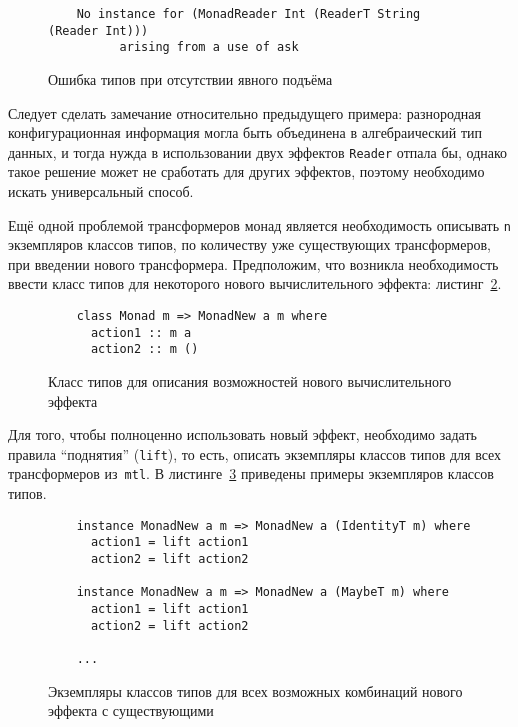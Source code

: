     \begin{figure}[t]
    \begin{lstlisting}
    No instance for (MonadReader Int (ReaderT String (Reader Int)))
          arising from a use of ask
    \end{lstlisting}
    \caption{Ошибка типов при отсутствии явного подъёма}
    \label{listing:mtlCompileError}
    \end{figure}

    Следует сделать замечание относительно предыдущего примера: разнородная
    конфигурационная информация могла быть объединена в алгебраический тип данных,
    и тогда нужда в использовании двух эффектов \lstinline{Reader} отпала бы,
    однако такое решение может не сработать для других эффектов, поэтому необходимо
    искать универсальный способ.

    Ещё одной проблемой трансформеров монад является необходимость описывать 
    \lstinline{n} экземпляров классов типов, 
    по количеству уже существующих трансформеров, при введении нового трансформера.  
    Предположим, что возникла необходимость ввести класс типов для некоторого нового 
    вычислительного эффекта: листинг~\ref{listing:mtlNewEffect}. 

    \begin{figure}[t]
    \begin{lstlisting}
    class Monad m => MonadNew a m where
      action1 :: m a
      action2 :: m ()
    \end{lstlisting}
    \caption{Класс типов для описания возможностей нового вычислительного эффекта}
    \label{listing:mtlNewEffect}
    \end{figure}

    Для того, чтобы полноценно использовать новый эффект, необходимо задать 
    правила ``поднятия'' (\lstinline{lift}), то есть, описать экземпляры классов типов для 
    всех трансформеров из~\lstinline{mtl}. В листинге~\ref{listing:mtlNewEffectInstances}
    приведены примеры экземпляров классов типов.

    \begin{figure}[t]
    \begin{lstlisting}
    instance MonadNew a m => MonadNew a (IdentityT m) where
      action1 = lift action1
      action2 = lift action2

    instance MonadNew a m => MonadNew a (MaybeT m) where
      action1 = lift action1
      action2 = lift action2

    ...

    \end{lstlisting}
    \caption{Экземпляры классов типов для всех возможных комбинаций нового эффекта 
    с существующими}
    \label{listing:mtlNewEffectInstances}
    \end{figure}

